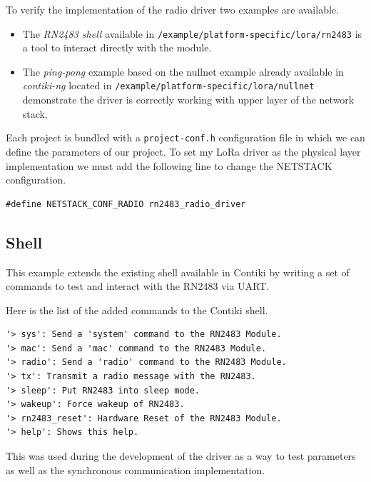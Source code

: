 To verify the implementation of the radio driver two examples are available.

\begin{itemize}
  \item The \emph{RN2483 shell} available in
    \lstinline{/example/platform-specific/lora/rn2483} is a tool to interact
    directly with the module.
  \item The \emph{ping-pong} example based on the nullnet example already
    available in \emph{contiki-ng} located in 
    \lstinline{/example/platform-specific/lora/nullnet} demonstrate the driver
    is correctly working with upper layer of the network stack.
\end{itemize}

Each project is bundled with a \lstinline{project-conf.h}
configuration file in which we can define the parameters of our project. 
To set my LoRa driver as the physical layer implementation we must add the
following line to change the NETSTACK configuration.

\begin{lstlisting}
#define NETSTACK_CONF_RADIO rn2483_radio_driver
\end{lstlisting}

\subsection{Shell}

This example extends the existing shell available in Contiki by writing a set
of commands to test and interact with the RN2483 via UART\@.

Here is the list of the added commands to the Contiki shell.

\begin{lstlisting}[language=none]
'> sys': Send a 'system' command to the RN2483 Module.
'> mac': Send a 'mac' command to the RN2483 Module.
'> radio': Send a 'radio' command to the RN2483 Module.
'> tx': Transmit a radio message with the RN2483.
'> sleep': Put RN2483 into sleep mode.
'> wakeup': Force wakeup of RN2483.
'> rn2483_reset': Hardware Reset of the RN2483 Module.
'> help': Shows this help.
\end{lstlisting}

This was used during the development of the driver as a way to test parameters
as well as the synchronous communication implementation.

